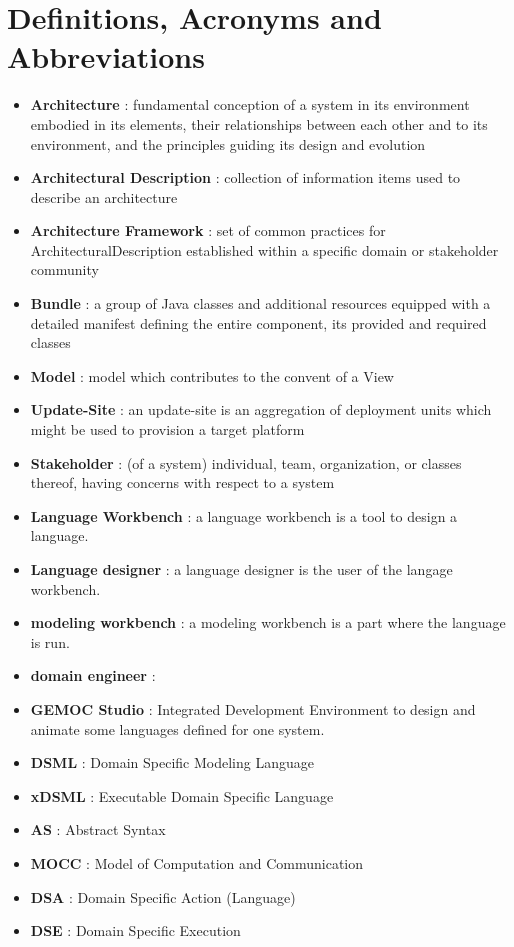 \documentclass{gemoc} %
\begin{document}

\section{Definitions, Acronyms and Abbreviations}
\begin{itemize}
	\item \textbf{Architecture}  : fundamental conception of a system in its environment
 embodied in its elements, their relationships between each other and to its 
environment, and the principles guiding its design and evolution
	\item \textbf{Architectural Description} : collection of information items used to describe an architecture
	\item \textbf{Architecture Framework} : set of common practices for ArchitecturalDescription established within a specific domain or stakeholder community
	\item \textbf{Bundle} : a group of Java classes and additional resources equipped with a detailed manifest defining the entire component, its provided and required classes
	\item \textbf{Model} : model which contributes to the convent of a View
	\item \textbf{Update-Site} : an update-site is an aggregation of deployment units which might be used to provision a target platform
	\item \textbf{Stakeholder} : (of a system) individual, team, organization, or classes thereof, having concerns with respect to a system 
	\item \textbf{Language Workbench} : a language workbench is a tool to design a language.
	\item \textbf{Language designer} : a language designer is the user of the langage workbench.
	\item \textbf{modeling workbench} : a modeling workbench is a part where the language is run.
	\item \textbf{domain engineer} :
	\item \textbf{GEMOC Studio} : Integrated Development Environment to design and animate some languages defined for one system.
	\item \textbf{DSML} : Domain Specific Modeling Language
	\item \textbf{xDSML} : Executable Domain Specific Language
	\item \textbf{AS} : Abstract Syntax
	\item \textbf{MOCC} : Model of Computation and Communication
	\item \textbf{DSA} : Domain Specific Action (Language)
	\item \textbf{DSE} : Domain Specific Execution
\end{itemize}
\end{document}

